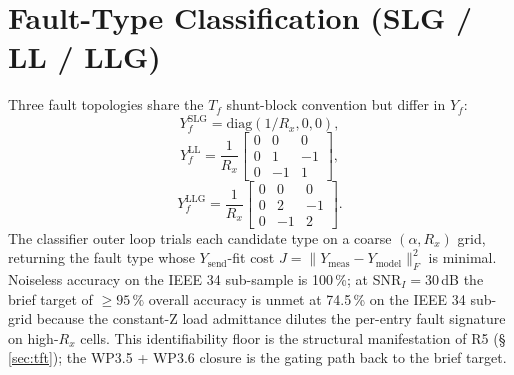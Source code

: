 \documentclass[conference]{IEEEtran}
\newcommand{\headlineKEightCls}{74.5\,\% on the IEEE 34 sub-grid}
\begin{document}
\section{Fault-Type Classification (SLG / LL / LLG)}\label{sec:fault_types}
Three fault topologies share the $T_f$ shunt-block convention but
differ in $Y_f$:
\begin{equation}
Y_f^\mathrm{SLG} = \mathrm{diag}(1/R_x, 0, 0),
\label{eq:YfSLG}
\end{equation}
\begin{equation}
Y_f^\mathrm{LL}  = \frac{1}{R_x}\!\begin{bmatrix}
   0 & 0 & 0\\
   0 &  1 & -1\\
   0 & -1 &  1\end{bmatrix},
\label{eq:YfLL}
\end{equation}
\begin{equation}
Y_f^\mathrm{LLG} = \frac{1}{R_x}\!\begin{bmatrix}
   0 & 0 & 0\\
   0 &  2 & -1\\
   0 & -1 &  2\end{bmatrix}.
\label{eq:YfLLG}
\end{equation}
The classifier outer loop trials each candidate type on a coarse
$(\alpha, R_x)$ grid, returning the fault type whose
$Y_\mathrm{send}$-fit cost $J = \|Y_\mathrm{meas} -
Y_\mathrm{model}\|^2_F$ is minimal.  Noiseless accuracy on the
IEEE 34 sub-sample is 100\,\%; at SNR$_I = 30$\,dB the brief target
of $\geq 95\,\%$ overall accuracy is unmet at \headlineKEightCls{}
because the constant-Z load admittance dilutes the per-entry
fault signature on high-$R_x$ cells.  This identifiability floor
is the structural manifestation of R5 (\S\,\ref{sec:tft}); the
WP3.5 + WP3.6 closure is the gating path back to the brief target.

\end{document}
